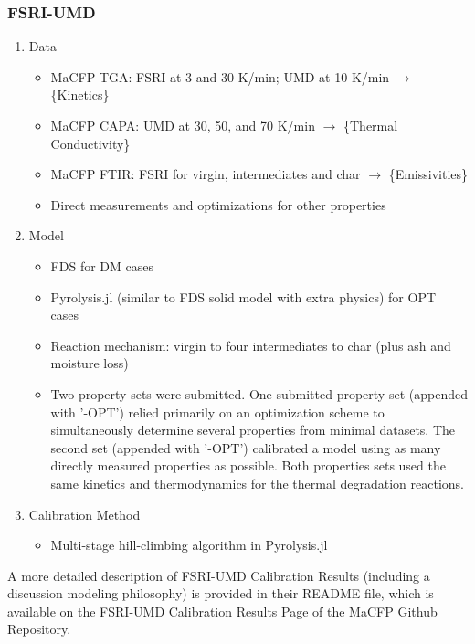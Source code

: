 \documentclass{article}
\begin{document}
\subsubsection*{FSRI-UMD}
\begin{enumerate}
	\item Data
	\begin{itemize}
		\item MaCFP TGA: FSRI at 3 and 30 K/min; UMD at 10 K/min $\rightarrow$ \{Kinetics\}
		\item MaCFP CAPA: UMD at 30, 50, and 70 K/min $\rightarrow$ \{Thermal Conductivity\}
		\item MaCFP FTIR: FSRI for virgin, intermediates and char $\rightarrow$ \{Emissivities\}
		\item Direct measurements and optimizations for other properties
	\end{itemize}
	
	\item Model
	\begin{itemize}
		\item FDS for DM cases
		\item Pyrolysis.jl (similar to FDS solid model with extra physics) for OPT cases
		\item Reaction mechanism: virgin to four intermediates to char (plus ash and moisture loss)
		\item Two property sets were submitted. One submitted property set (appended with '-OPT') relied primarily on an optimization scheme to simultaneously determine several properties from minimal datasets. The second set (appended with '-OPT') calibrated a model using as many directly measured properties as possible. Both properties sets used the same kinetics and thermodynamics for the thermal degradation reactions.
	\end{itemize}
	
	\item Calibration Method
	\begin{itemize}
		\item Multi-stage hill-climbing algorithm in Pyrolysis.jl
	\end{itemize}
\end{enumerate}
A more detailed description of FSRI-UMD Calibration Results (including a discussion modeling philosophy) is provided in their README file, which is available on the \href{https://github.com/MaCFP/matl-db/tree/master/Wood/Calibration_Results/UMD_FSRI/README.md}{FSRI-UMD Calibration Results Page} of the MaCFP Github Repository.
\end{document}
